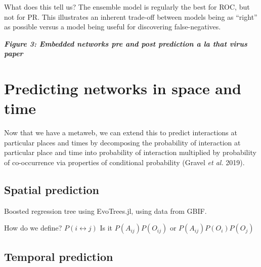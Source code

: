 \documentclass[11pt]{article}
\begin{document}
What does this tell us? The ensemble model is regularly the best for
ROC, but not for PR. This illustrates an inherent trade-off between
models being as ``right'' as possible versus a model being useful for
discovering false-negatives.

\textbf{\emph{Figure 3: Embedded networks pre and post prediction a la
that virus paper}}

\hypertarget{predicting-networks-in-space-and-time}{%
\section{Predicting networks in space and
time}\label{predicting-networks-in-space-and-time}}

Now that we have a metaweb, we can extend this to predict interactions
at particular places and times by decomposing the probability of
interaction at particular place and time into probability of interaction
multiplied by probability of co-occurrence via properties of conditional
probability (Gravel \emph{et al.} 2019).

\hypertarget{spatial-prediction}{%
\subsection{Spatial prediction}\label{spatial-prediction}}

Boosted regression tree using EvoTrees.jl, using data from GBIF.

How do we define? \(P(i \leftrightarrow j)\) Is it
\(P(A_{ij})P(O_{ij})\) or \(P(A_{ij})P(O_i)P(O_j)\)

\hypertarget{temporal-prediction}{%
\subsection{Temporal prediction}\label{temporal-prediction}}
\end{document}
